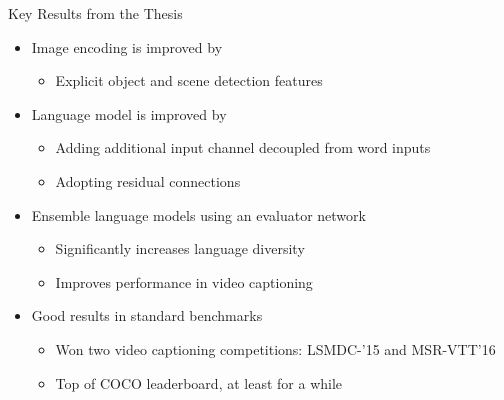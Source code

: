 \documentclass{beamer}
\begin{document}
\begin{frame}{Key Results from the Thesis}
\begin{itemize}
\item Image encoding is improved by
    \begin{itemize}
        \item Explicit object and scene detection features
    \end{itemize}
\item Language model is improved by 
    \begin{itemize}
        \item Adding additional input channel decoupled from word inputs
        \item Adopting residual connections 
    \end{itemize}
\item Ensemble language models using an evaluator network
    \begin{itemize}
        \item Significantly increases language diversity
        \item Improves performance in video captioning
    \end{itemize}
\item Good results in standard benchmarks
    \begin{itemize}
        \item Won two video captioning competitions: LSMDC-'15 and MSR-VTT'16 
        \item Top of COCO leaderboard, at least for a while
    \end{itemize}
\end{itemize}
\end{frame}

\end{document}
